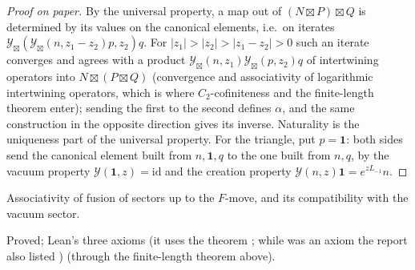 \begin{proof}[Proof on paper]
By the universal property, a map out of $(N\boxtimes P)\boxtimes Q$ is determined by its values on the canonical
elements, i.e.\ on iterates $\mathcal Y_{\boxtimes}(\mathcal Y_{\boxtimes}(n,z_1-z_2)p,z_2)q$. For $|z_1|>|z_2|>|z_1-z_2|>0$
such an iterate converges and agrees with a product $\mathcal Y_{\boxtimes}(n,z_1)\mathcal Y_{\boxtimes}(p,z_2)q$ of
intertwining operators into $N\boxtimes(P\boxtimes Q)$ (convergence and associativity of logarithmic intertwining
operators, which is where $C_2$-cofiniteness and the finite-length theorem enter); sending the first to the second
defines $\alpha$, and the same construction in the opposite direction gives its inverse. Naturality is the uniqueness
part of the universal property. For the triangle, put $p=\mathbf 1$: both sides send the canonical element built
from $n,\mathbf 1,q$ to the one built from $n,q$, by the vacuum property $\mathcal Y(\mathbf 1,z)=\mathrm{id}$ and the
creation property $\mathcal Y(n,z)\mathbf 1=e^{zL_{-1}}n$.
\end{proof}

\begin{physics}
Associativity of fusion of sectors up to the $F$-move, and its compatibility with the vacuum sector.
\end{physics}

\begin{status}
Proved; Lean's three axioms (it uses the theorem ; while  was an axiom the report also listed ) (through the finite-length theorem above).
\end{status}

